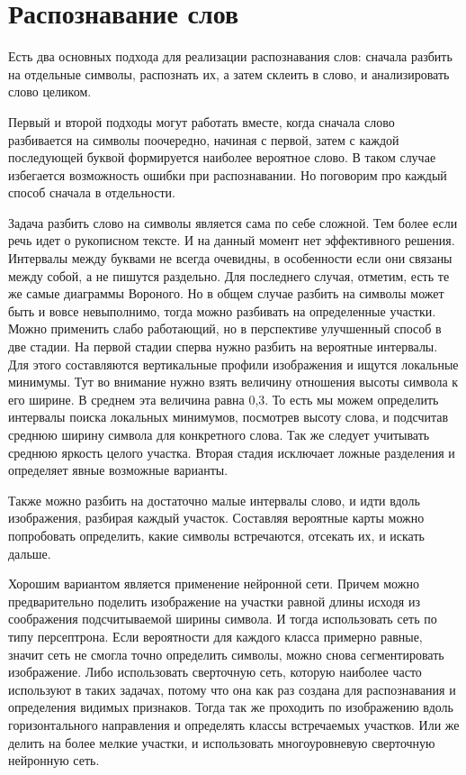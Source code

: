 \section{Распознавание слов} \label{ch3:sec2}

Есть два основных подхода для реализации распознавания слов: сначала разбить на отдельные символы, распознать их, а затем склеить в слово, и анализировать слово целиком.

Первый и второй подходы могут работать вместе, когда сначала слово разбивается на символы поочередно, начиная с первой, затем с каждой последующей буквой формируется наиболее вероятное слово. В таком случае избегается возможность ошибки при распознавании. Но поговорим про каждый способ сначала в отдельности.

Задача разбить слово на символы является сама по себе сложной. Тем более если речь идет о рукописном тексте. И на данный момент нет эффективного решения. Интервалы между буквами не всегда очевидны, в особенности если они связаны между собой, а не пишутся раздельно. Для последнего случая, отметим, есть те же самые диаграммы Вороного. Но в общем случае разбить на символы может быть и вовсе невыполнимо, тогда можно разбивать на определенные участки. Можно применить слабо работающий, но в перспективе улучшенный способ в две стадии. На первой стадии сперва нужно разбить на вероятные интервалы. Для этого составляются вертикальные профили изображения и ищутся локальные минимумы. Тут во внимание нужно взять величину отношения высоты символа к его ширине. В среднем эта величина равна 0,3. То есть мы можем определить интервалы поиска локальных минимумов, посмотрев высоту слова, и подсчитав среднюю ширину символа для конкретного слова. Так же следует учитывать среднюю яркость целого участка. Вторая стадия исключает ложные разделения и определяет явные возможные варианты.

Также можно разбить на достаточно малые интервалы слово, и идти вдоль изображения, разбирая каждый участок. Составляя вероятные карты можно попробовать определить, какие символы встречаются, отсекать их, и искать дальше.

Хорошим вариантом является применение нейронной сети. Причем можно предварительно поделить изображение на участки равной длины исходя из соображения подсчитываемой ширины символа. И тогда использовать сеть по типу персептрона. Если вероятности для каждого класса примерно равные, значит сеть не смогла точно определить символы, можно снова сегментировать изображение. Либо использовать сверточную сеть, которую наиболее часто используют в таких задачах, потому что она как раз создана для распознавания и определения видимых признаков. Тогда так же проходить по изображению вдоль горизонтального направления и определять классы встречаемых участков. Или же делить на более мелкие участки, и использовать многоуровневую сверточную нейронную сеть.

